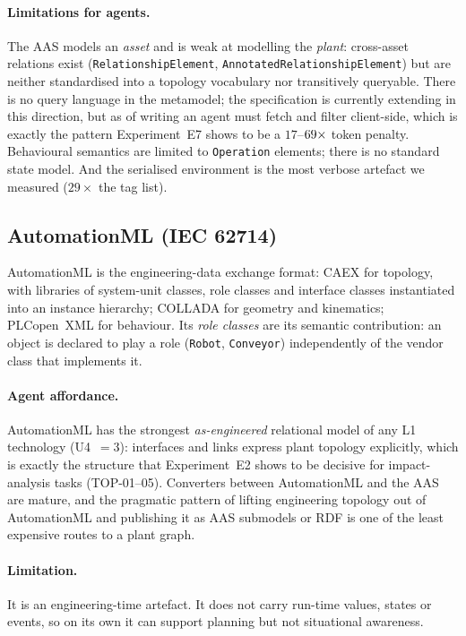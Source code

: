 \paragraph{Limitations for agents.} The AAS models an \emph{asset} and is weak
at modelling the \emph{plant}: cross-asset relations exist
(\texttt{RelationshipElement}, \texttt{AnnotatedRelationshipElement}) but are
neither standardised into a topology vocabulary nor transitively queryable.
There is no query language in the metamodel; the specification is currently
extending in this direction, but as of writing an agent must fetch and filter
client-side, which is exactly the pattern Experiment~E7 shows to be a
$17$--$69\times$ token penalty. Behavioural semantics are limited to
\texttt{Operation} elements; there is no standard state model. And the serialised
environment is the most verbose artefact we measured ($29\times$ the tag list).

\subsection{AutomationML (IEC 62714)}

AutomationML \cite{iec62714} is the engineering-data exchange format: CAEX for
topology, with
libraries of system-unit classes, role classes and interface classes instantiated
into an instance hierarchy; COLLADA for geometry
and kinematics; PLCopen~XML for behaviour. Its \emph{role classes} are its
semantic contribution: an object is declared to play a role
(\texttt{Robot}, \texttt{Conveyor}) independently of the vendor class that
implements it.

\paragraph{Agent affordance.} AutomationML has the strongest \emph{as-engineered}
relational model of any L1 technology (U4~$=3$): interfaces and links express
plant topology explicitly, which is exactly the structure that Experiment~E2
shows to be decisive for impact-analysis tasks (TOP-01--05). Converters between
AutomationML and the AAS are mature, and the pragmatic pattern of lifting
engineering topology out of AutomationML and publishing it as AAS submodels or
RDF is one of the least expensive routes to a plant graph.

\paragraph{Limitation.} It is an engineering-time artefact. It does not carry
run-time values, states or events, so on its own it can support planning but not
situational awareness.

